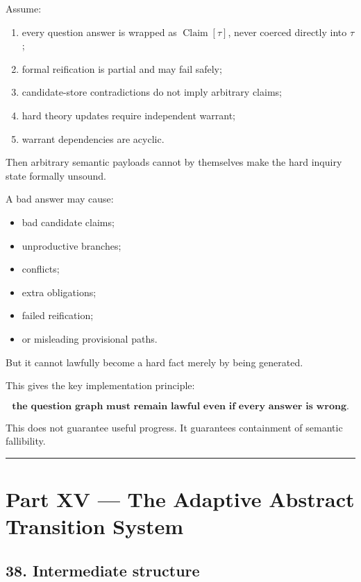 \documentclass[
]{article}
\providecommand{\tightlist}{%
  \setlength{\itemsep}{0pt}\setlength{\parskip}{0pt}}
\begin{document}
Assume:

\begin{enumerate}
\def\labelenumi{\arabic{enumi}.}
\tightlist
\item
  every question answer is wrapped as \(\operatorname{Claim}[\tau]\),
  never coerced directly into \(\tau\);
\item
  formal reification is partial and may fail safely;
\item
  candidate-store contradictions do not imply arbitrary claims;
\item
  hard theory updates require independent warrant;
\item
  warrant dependencies are acyclic.
\end{enumerate}

Then arbitrary semantic payloads cannot by themselves make the hard
inquiry state formally unsound.

A bad answer may cause:

\begin{itemize}
\tightlist
\item
  bad candidate claims;
\item
  unproductive branches;
\item
  conflicts;
\item
  extra obligations;
\item
  failed reification;
\item
  or misleading provisional paths.
\end{itemize}

But it cannot lawfully become a hard fact merely by being generated.

This gives the key implementation principle:

\[
\boxed{
\textbf{the question graph must remain lawful even if every answer is wrong.}
}
\]

This does not guarantee useful progress. It guarantees containment of
semantic fallibility.

\begin{center}\rule{0.5\linewidth}{0.5pt}\end{center}

\section{Part XV --- The Adaptive Abstract Transition
System}\label{part-xv-the-adaptive-abstract-transition-system}

\subsection{38. Intermediate structure}\label{intermediate-structure}
\end{document}
